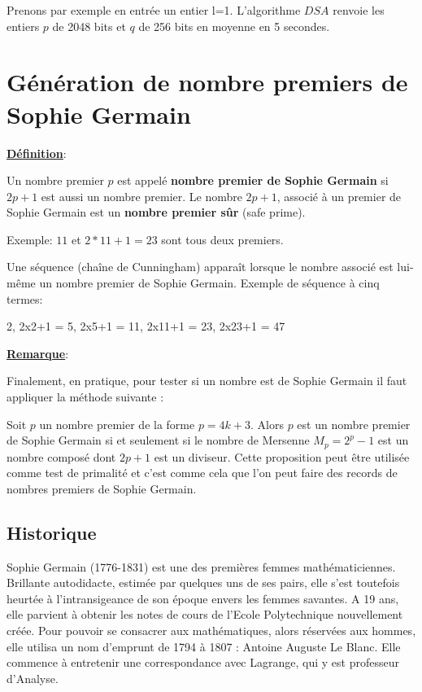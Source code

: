 Prenons par exemple en entrée un entier l=1. L'algorithme $DSA$ renvoie les entiers $p$ de 2048 bits et $q$ de 256 bits en moyenne en 5 secondes. 

\clearpage

\section{Génération de nombre premiers de Sophie Germain}

\underline{\textbf{Définition}}:

Un nombre premier $p$ est appelé \textbf{nombre premier de Sophie Germain} si $2p+1$ est aussi un nombre premier.
Le nombre $2p + 1$, associé à un premier de Sophie Germain est un \textbf{nombre premier sûr} (safe prime).

Exemple: $11$ et $2*11+1 = 23$ sont tous deux premiers.

Une séquence (chaîne de Cunningham)  apparaît lorsque le nombre associé est lui-même un nombre premier de Sophie Germain. Exemple de séquence à cinq termes:

2, 2x2+1 = 5, 2x5+1 = 11, 2x11+1 = 23, 2x23+1 = 47

\underline{\textbf{Remarque}}:

Finalement, en pratique, pour tester si un nombre est de Sophie Germain il faut appliquer la méthode suivante :

Soit $p$ un nombre premier de la forme $p=4k+3$. Alors $p$ est un nombre premier de Sophie Germain si et seulement si le nombre de Mersenne $M_p = 2^{p} - 1$ est un nombre composé dont $2p+1$ est un diviseur. Cette proposition peut être utilisée comme test de primalité et c'est comme cela que l'on peut faire des records de nombres premiers de Sophie Germain.


\subsection{Historique}

Sophie Germain (1776-1831) est une des premières femmes mathématiciennes. Brillante autodidacte, estimée par quelques uns de ses pairs, elle s'est toutefois heurtée à l'intransigeance de son époque envers les femmes savantes.
A 19 ans, elle parvient à obtenir les notes de cours de l'Ecole Polytechnique nouvellement créée. Pour pouvoir se consacrer aux mathématiques, alors réservées aux hommes, elle utilisa un nom d’emprunt de 1794 à 1807 : Antoine Auguste Le Blanc. Elle commence à entretenir une correspondance avec Lagrange, qui y est professeur d'Analyse.

